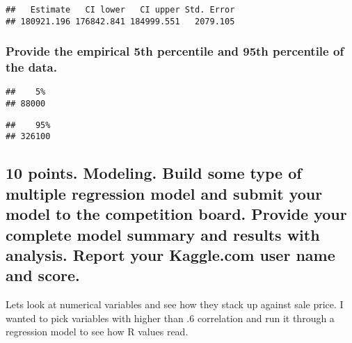 \documentclass[]{article}
\newenvironment{Shaded}{\begin{snugshade}}{\end{snugshade}}
\newcommand{\KeywordTok}[1]{\textcolor[rgb]{0.13,0.29,0.53}{\textbf{#1}}}
\newcommand{\DecValTok}[1]{\textcolor[rgb]{0.00,0.00,0.81}{#1}}
\newcommand{\OperatorTok}[1]{\textcolor[rgb]{0.81,0.36,0.00}{\textbf{#1}}}
\newcommand{\NormalTok}[1]{#1}
\begin{document}
\begin{verbatim}
##   Estimate   CI lower   CI upper Std. Error 
## 180921.196 176842.841 184999.551   2079.105
\end{verbatim}

\subsubsection{Provide the empirical 5th percentile and 95th percentile
of the
data.}\label{provide-the-empirical-5th-percentile-and-95th-percentile-of-the-data.}

\begin{Shaded}
\end{Shaded}

\begin{verbatim}
##    5% 
## 88000
\end{verbatim}

\begin{Shaded}
\end{Shaded}

\begin{verbatim}
##    95% 
## 326100
\end{verbatim}

\subsection{10 points. Modeling. Build some type of multiple regression
model and submit your model to the competition board. Provide your
complete model summary and results with analysis. Report your Kaggle.com
user name and
score.}\label{points.-modeling.-build-some-type-of-multiple-regression-model-and-submit-your-model-to-the-competition-board.-provide-your-complete-model-summary-and-results-with-analysis.-report-your-kaggle.com-user-name-and-score.}

Lets look at numerical variables and see how they stack up against sale
price. I wanted to pick variables with higher than .6 correlation and
run it through a regression model to see how R values read.
\end{document}
